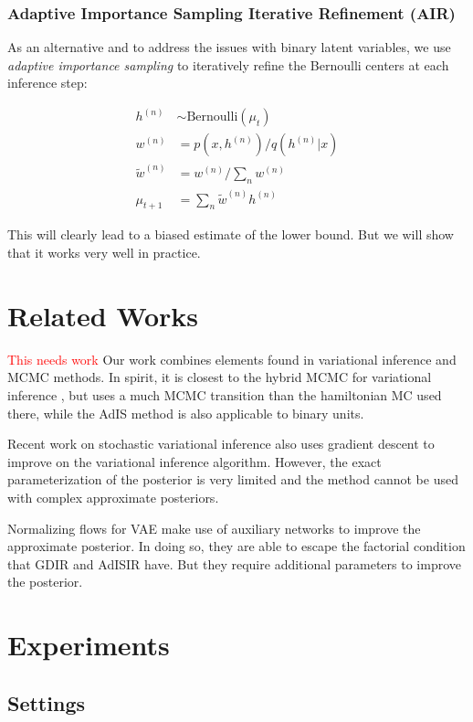 \documentclass{article} %
\newcommand{\alert}[1]{\textcolor{red}{#1}}
\newcommand{\Bernoulli}{\text{Bernoulli}}
\begin{document}
\subsubsection{Adaptive Importance Sampling Iterative Refinement (AIR)}
As an alternative and to address the issues with binary latent variables, we use \emph{adaptive importance sampling} \citep{karamchandani1989adaptive} to iteratively refine the Bernoulli centers at each inference step:

\begin{align}
    h^{(n)} &\sim \Bernoulli(\mu_t) \nonumber \\
w^{(n)} &= p(x, h^{(n)}) / q(h^{(n)} | x) \nonumber \\
\tilde{w}^{(n)} &= w^{(n)} / \sum_n w^{(n)} \nonumber \\
\mu_{t+1} &= \sum_n \tilde{w}^{(n)} h^{(n)}
\end{align}

This will clearly lead to a biased estimate of the lower bound. But we will show that it works very well in practice.

\section{Related Works}
\alert{This needs work}
Our work combines elements found in variational inference and MCMC methods. In spirit, it is closest to the hybrid MCMC for variational inference \citep{salimans2014markov}, but uses a much MCMC transition than the hamiltonian MC used there, while the AdIS method is also applicable to binary units.

Recent work on stochastic variational inference \cite{hoffman2013stochastic} also uses gradient descent to improve on the variational inference algorithm. However, the exact parameterization of the posterior is very limited and the method cannot be used with complex approximate posteriors. 

Normalizing flows for VAE \citep{rezende2015variational} make use of auxiliary networks to improve the approximate posterior. In doing so, they are able to escape the factorial condition that GDIR and AdISIR have. But they require additional parameters to improve the posterior.

\section{Experiments}

\subsection{Settings}
\end{document}
